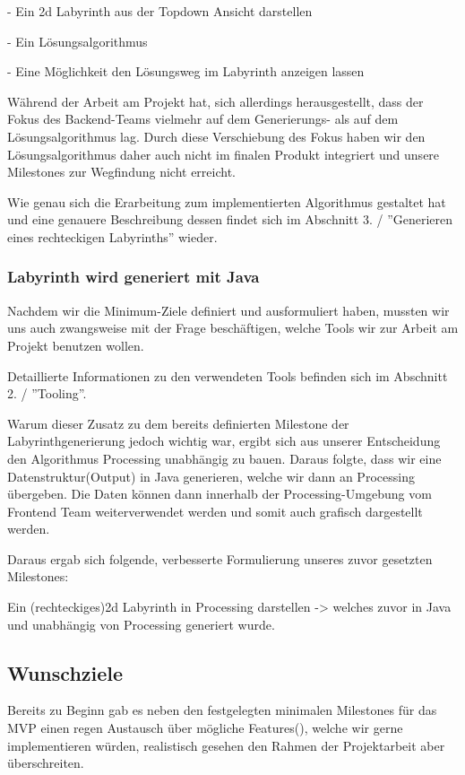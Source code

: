 	- Ein 2d Labyrinth aus der Topdown Ansicht darstellen

	- Ein Lösungsalgorithmus
	
	- Eine Möglichkeit den Lösungsweg im Labyrinth anzeigen lassen
	
	Während der Arbeit am Projekt hat, sich allerdings herausgestellt, dass der Fokus des Backend-Teams vielmehr auf dem Generierungs- als auf dem Lösungsalgorithmus lag. Durch diese Verschiebung des Fokus haben wir den Lösungsalgorithmus daher auch nicht im finalen Produkt integriert und unsere Milestones zur Wegfindung nicht erreicht.

	Wie genau sich die Erarbeitung zum implementierten Algorithmus gestaltet hat und eine genauere Beschreibung dessen findet sich im Abschnitt 3. / ''Generieren eines rechteckigen Labyrinths'' wieder.

    \subsubsection*{Labyrinth wird generiert mit Java}
		Nachdem wir die Minimum-Ziele definiert und ausformuliert haben, mussten wir uns auch zwangsweise mit der Frage beschäftigen, welche Tools wir zur Arbeit am Projekt benutzen wollen.

		Detaillierte Informationen zu den verwendeten Tools befinden sich im Abschnitt 2. / ''Tooling''.

		Warum dieser Zusatz zu dem bereits definierten Milestone der Labyrinthgenerierung jedoch wichtig war, ergibt sich aus unserer Entscheidung den Algorithmus Processing unabhängig zu bauen. Daraus folgte, dass wir eine Datenstruktur(Output) in Java generieren, welche wir dann an Processing übergeben. Die Daten können dann innerhalb der Processing-Umgebung vom Frontend Team weiterverwendet werden und somit auch grafisch dargestellt werden.

		Daraus ergab sich folgende, verbesserte Formulierung unseres zuvor gesetzten Milestones:

		Ein (rechteckiges)2d Labyrinth in Processing darstellen -> welches zuvor in Java und unabhängig von Processing generiert wurde.

\subsection{Wunschziele}\label{subsec:Wunschziele}
	Bereits zu Beginn gab es neben den festgelegten minimalen Milestones für das MVP einen regen Austausch über mögliche Features(), welche wir gerne implementieren würden, realistisch gesehen den Rahmen der Projektarbeit aber überschreiten.

